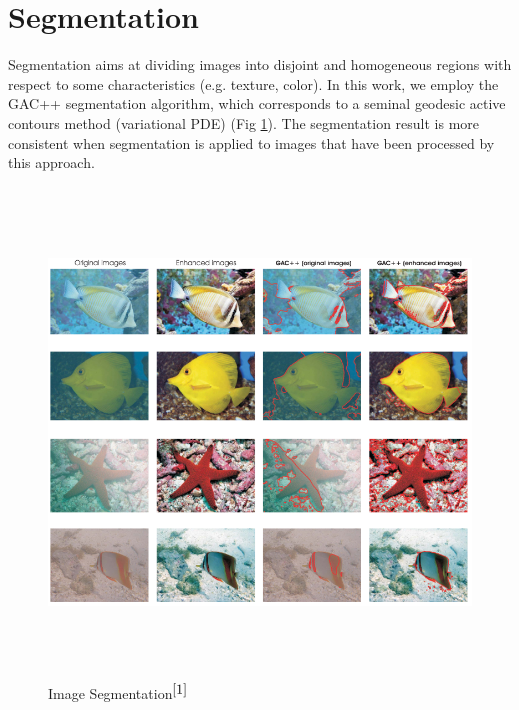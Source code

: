 \documentclass[hidelinks, 12pt]{report}
\begin{document}
\section{Segmentation}
Segmentation aims at dividing images into disjoint and homogeneous regions with respect to some characteristics (e.g. texture, color). In this work, we employ the GAC++ segmentation algorithm, which corresponds to a seminal geodesic active contours method (variational PDE) (Fig \ref{Segmentation}). The segmentation result is more consistent when segmentation is applied to images that have been processed by this approach.
\begin{figure}[H]
\centering
\includegraphics[width=15cm,height=13cm]{Segment.png}
\caption[Image Segmentation]{Image Segmentation$^{\cite{1}}$}
\label{Segmentation}
\end{figure}
\end{document}
